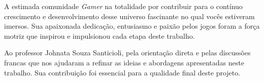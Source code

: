 \begin{agradecimentos}

A estimada comunidade \textit{Gamer} na totalidade por contribuir para o contínuo crescimento e desenvolvimento desse universo fascinante no qual vocês estiveram imersos. Sua apaixonada dedicação, entusiasmo e paixão pelos jogos foram a força motriz que inspirou e impulsionou cada etapa deste trabalho.

Ao professor Johnata Souza Santicioli, pela orientação direta e pelas discussões francas que nos ajudaram a refinar as ideias e abordagens apresentadas neste trabalho. Sua contribuição foi essencial para a qualidade final deste projeto.

\end{agradecimentos}

\pagebreak